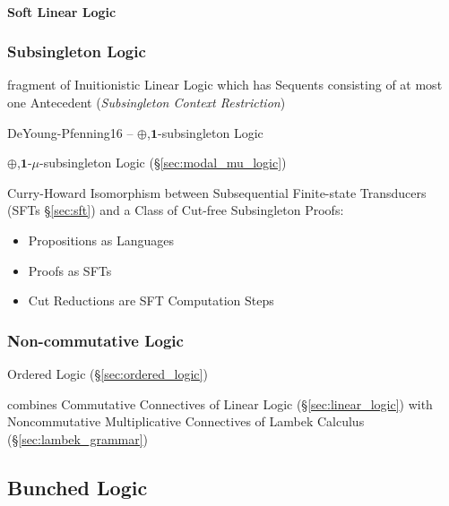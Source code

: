 \paragraph{Soft Linear Logic}\label{sec:soft_linear_logic}\hfill



\subsubsection{Subsingleton Logic}\label{sec:subsingleton_logic}

fragment of Inuitionistic Linear Logic which has Sequents consisting
of at most one Antecedent (\emph{Subsingleton Context Restriction})

DeYoung-Pfenning16 -- $\oplus$,$\mathbf{1}$-subsingleton Logic

\fist $\oplus$,$\mathbf{1}$-$\mu$-subsingleton Logic
(\S\ref{sec:modal_mu_logic})

Curry-Howard Isomorphism between Subsequential Finite-state
Transducers (SFTs \S\ref{sec:sft}) and a Class of Cut-free
Subsingleton Proofs:
\begin{itemize}
  \item Propositions as Languages
  \item Proofs as SFTs
  \item Cut Reductions are SFT Computation Steps
\end{itemize}



\subsubsection{Non-commutative Logic}\label{sec:noncommutative_logic}
\hfill

\fist Ordered Logic (\S\ref{sec:ordered_logic})

combines Commutative Connectives of Linear Logic
(\S\ref{sec:linear_logic}) with Noncommutative Multiplicative
Connectives of Lambek Calculus (\S\ref{sec:lambek_grammar})



\subsection{Bunched Logic}\label{sec:bunched_logic}

\begingroup

